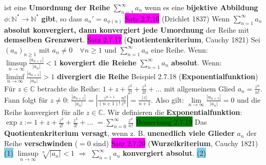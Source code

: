 \documentclass[landscape, 10pt]{article}
\newcommand{\N}{\mathbb{N}}
\newcommand{\C}{\mathbb{C}}
\begin{document}
\begin{multicols}{3}
                ist eine 
                \textbf{Umordnung der Reihe} \textcolor{NavyBlue}{$\sum_{n=1}^\infty a_n$} 
                wenn es eine \textbf{bijektive Abbildung} 
         \textcolor{NavyBlue}{$\phi :\N^*\longrightarrow\N^*$} 
                \textbf{gibt}, so dass 
                \textcolor{NavyBlue}{$a_n'=a_{\phi(n)}$}
\colorbox{magenta}{Satz 2.7.16} (Drichlet 1837) Wenn 
                \textcolor{NavyBlue}{$\sum_{n=1}^\infty a_n$} \textbf{absolut 
                konvergiert, dann konvergiert jede Umordnung} der Reihe 
         mit \textbf{demselben Grenzwert}.
\colorbox{magenta}{Satz 2.7.17} (\textbf{Quotientenkriterium}, Cauchy 1821) Sei 
                \textcolor{NavyBlue}{$(a_n)_{n\geqslant1}$} mit 
                \textcolor{NavyBlue}{$a_n\neq0\quad\forall n\geqslant1$}
                und \textcolor{NavyBlue}{$\sum_{n=1}^\infty a_n$} eine Reihe.
         Wenn: 
                \textcolor{NavyBlue}{$\limsup\limits_{n\to\infty}\frac{|a_{n+1}|}{|a_n|}<1$}
                \textbf{kovergiert die Reiehe} 
                \textcolor{NavyBlue}{$\sum_{n=1}^\infty a_n$} \textbf{absolut}.
                Wenn: 
                \textcolor{NavyBlue}{$\liminf\limits_{n\to\infty}\frac{|a_{n+1}|}{|a_n|}>1$}
                \textbf{divergiert die Reihe}
\colorbox{Dandelion}{Beispiel 2.7.18} (\textbf{Exponentialfunktion})
                Für $z\in\C$ betrachte die Reihe:
                $1+z+\frac{z^2}{2!}+\frac{z^3}{3!}+\dots$
                mit allgemeinem Glied 
                $a_n=\frac{z^n}{n!}$.
                Fann folgt für $z\neq0$:
                $\frac{|a_{n+1}|}{|a_n|}
                =|\frac{z^{n+1}}{(n+1)!}\frac{n!}{z^n}|
                =\frac{|z|}{n+1}$. Also gilt:
                $\lim\limits_{n\to\infty}\frac{|a_{n+1}|}{|a_n|}=0$
                und die Reihe konvergiert 
                für alle $z\in\C$.
                Wir definieren die \textbf{Exponentialfunktion}: 
                $\exp z:=1+z+\frac{z^2}{2!}+\frac{z^3}{3!}+\dots$
                $=\sum_{n=0}^\infty\frac{z^n}{n!}$
\colorbox{green}{Bemerkung 2.7.19} Das \textbf{Quotientenkriterium versagt}, wenn z. B. 
                \textbf{unenedlich viele Glieder} $a_n$ der Reihe 
         \textbf{verschwinden} ($=0$ sind)
\colorbox{magenta}{Satz 2.7.20} (\textbf{Wurzelkriterium}, Cauchy 1821)
                \colorbox{SkyBlue}{(1)} 
                \textcolor{NavyBlue}{$\limsup\limits_{n\to\infty}\sqrt[n]{|a_n|}<1$}
                $\Longrightarrow$
                \textcolor{NavyBlue}{$\sum_{n=1}^\infty a_n$} \textbf{konvergiert absolut}.
         \colorbox{SkyBlue}{(2)} 

\end{multicols}
\end{document}
